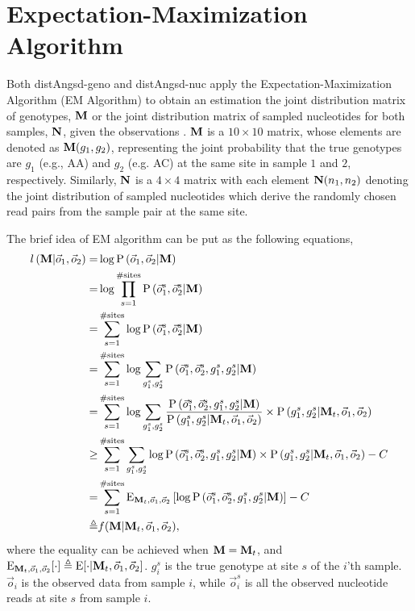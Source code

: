 \documentclass{article}
\begin{document}
\section{Expectation-Maximization Algorithm} \label{sec:EM}
Both distAngsd-geno and distAngsd-nuc apply the Expectation-Maximization Algorithm (EM Algorithm) to obtain an estimation the joint distribution matrix of genotypes, ${\bf M}$ or the joint distribution matrix of sampled nucleotides for both samples, ${\bf N}$, given the observations . ${\bf M}$ is a $10\times 10$ matrix, whose elements are denoted as ${\bf M}(g_1,g_2)$, representing the joint probability that the true genotypes are $g_1$ (e.g., AA) and $g_2$ (e.g. AC) at the same site in sample $1$ and $2$, respectively. Similarly, ${\bf N}$ is a $4\times 4$ matrix with each element ${\bf N}(n_1,n_2)$ denoting the joint distribution of sampled nucleotides which derive the randomly chosen read pairs from the sample pair at the same site.

The brief idea of EM algorithm can be put as the following equations,
\begin{align}
l\left({\bf M}|\vec{o}_1,\vec{o}_2\right)=&\log\mathrm{P}\left(\vec{o}_1,\vec{o}_2|{\bf M}\right)\nonumber\\
=&\log\prod_{s=1}^{\#\mathrm{sites}}\mathrm{P}\left(\vec{o}_1^s,\vec{o}_2^s|{\bf M}\right)\nonumber\\
=&\sum_{s=1}^{\#\mathrm{sites}}\log\mathrm{P}\left(\vec{o}_1^s,\vec{o}_2^s|{\bf M}\right)\nonumber\\
=&\sum_{s=1}^{\#\mathrm{sites}}\log\sum_{g_1^s,g_2^s}\mathrm{P}\left(\vec{o}_1^s,\vec{o}_2^s,g_1^s,g_2^s|{\bf M}\right)\nonumber\\
=&\sum_{s=1}^{\#\mathrm{sites}}\log\sum_{g_1^s,g_2^s}\frac{\mathrm{P}\left(\vec{o}_1^s,\vec{o}_2^s,g_1^s,g_2^s|{\bf M}\right)}{\mathrm{P}\left(g_1^s,g_2^s|{\bf M}_{t},\vec{o}_1,\vec{o}_2\right)}\times \mathrm{P}\left(g_1^s,g_2^s|{\bf M}_{t},\vec{o}_1,\vec{o}_2\right)\nonumber\\
\geq&\sum_{s=1}^{\#\mathrm{sites}}\sum_{g_1^s,g_2^s}\log\mathrm{P}\left(\vec{o}_1^s,\vec{o}_2^s,g_1^s,g_2^s|{\bf M}\right)\times \mathrm{P}\left(g_1^s,g_2^s|{\bf M}_{t},\vec{o}_1,\vec{o}_2\right)-C \nonumber\\
=&\sum_{s=1}^{\#\mathrm{sites}}\mathrm{E}_{{\bf M}_{t},\vec{o}_1,\vec{o}_2}\left[\log\mathrm{P}\left(\vec{o}_1^s,\vec{o}_2^s,g_1^s,g_2^s|{\bf M}\right)\right]-C \nonumber\\
\triangleq& f({\bf M}|{\bf M}_t,\vec{o}_1,\vec{o}_2), \label{eq:distAngsd-genoEM}
\end{align}
where the equality can be achieved when ${\bf M}={\bf M}_t$, and $\mathrm{E}_{{\bf M}_{t},\vec{o}_1,\vec{o}_2}[\cdot]\triangleq \mathrm{E}[\cdot|{\bf M}_{t},\vec{o}_1,\vec{o}_2]$. $g_i^s$ is the true genotype at site $s$ of the $i$'th sample. $\vec{o}_i$ is the observed data from sample $i$, while $\vec{o}_i^s$ is all the observed nucleotide reads at site $s$ from sample $i$.
\end{document}
